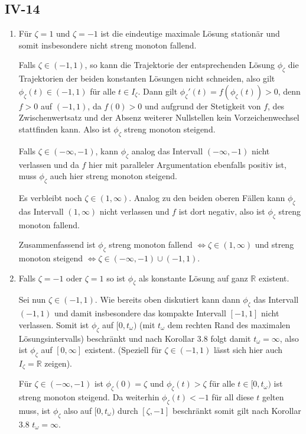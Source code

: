 \documentclass[a4paper]{article}
\begin{document}
\subsection{IV-14}

\begin{enumerate}
    \item Für $\zeta = 1$ und $\zeta = -1$ ist die eindeutige maximale Lösung stationär und somit insbesondere nicht streng monoton fallend.
    
    Falls $\zeta \in (-1,1)$, so kann die Trajektorie der entsprechenden Lösung $\phi_\zeta$ die Trajektorien der beiden konstanten Lösungen nicht schneiden, also gilt $\phi_\zeta(t) \in (-1,1)$ für alle $t \in I_\zeta$. 
    Dann gilt $\phi_\zeta'(t) = f(\phi_\zeta(t)) > 0$, denn $f > 0$ auf $(-1, 1)$, da $f(0) > 0$ und aufgrund der Stetigkeit von $f$, des Zwischenwertsatz und der Absenz weiterer Nullstellen kein Vorzeichenwechsel stattfinden kann. 
    Also ist $\phi_\zeta$ streng monoton steigend.

    Falls $\zeta \in (-\infty, -1)$, kann $\phi_\zeta$ analog das Intervall $(-\infty, -1)$ nicht verlassen und da $f$ hier mit paralleler Argumentation ebenfalls positiv ist, muss $\phi_\zeta$ auch hier streng monoton steigend.

    Es verbleibt noch $\zeta \in (1, \infty)$. Analog zu den beiden oberen Fällen kann $\phi_\zeta$ das Intervall $(1, \infty)$ nicht verlassen und $f$ ist dort negativ, also ist $\phi_\zeta$ streng monoton fallend.

    Zusammenfassend ist $\phi_\zeta$ streng monoton fallend $\iff \zeta \in (1, \infty)$ und streng monoton steigend $\iff \zeta \in (-\infty, -1) \cup (-1, 1)$.
    \item Falls $\zeta = -1$ oder $\zeta = 1$ so ist $\phi_\zeta$ als konstante Lösung auf ganz $\mathds{R}$ existent.
    
    Sei nun $\zeta \in (-1,1)$.
    Wie bereits oben diskutiert kann dann $\phi_\zeta$ das Intervall $(-1, 1)$ und damit insbesondere das kompakte Intervall $[-1,1]$ nicht verlassen.
    Somit ist $\phi_\zeta$ auf $[0, t_\omega)$ (mit $t_\omega$ dem rechten Rand des maximalen Lösungsintervalls) beschränkt und nach Korollar 3.8 folgt damit $t_\omega = \infty$, also ist $\phi_\zeta$ auf $[0, \infty]$ existent. (Speziell für $\zeta \in (-1,1)$ lässt sich hier auch $I_\zeta = \mathds{R}$ zeigen).

    Für $\zeta \in (-\infty, -1)$ ist $\phi_\zeta(0) = \zeta$ und $\phi_\zeta(t) > \zeta$ für alle $t \in [0, t_\omega)$ ist streng monoton steigend.
    Da weiterhin $\phi_\zeta(t) < -1$ für all diese $t$ gelten muss, ist $\phi_\zeta$ also auf $[0, t_\omega)$  durch $[\zeta, -1]$ beschränkt somit gilt nach Korollar 3.8 $t_\omega = \infty$.


\end{enumerate}
\end{document}
